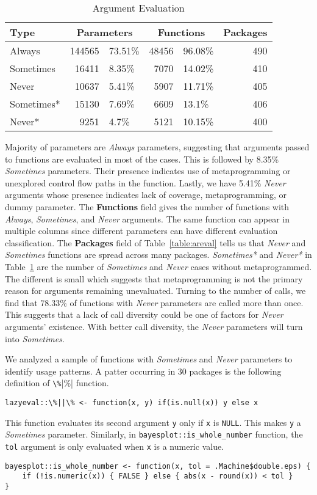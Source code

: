 \documentclass[review,nonacm,screen,acmsmall,anonymous=true]{acmart}
\newcommand{\always}{\emph{Always}\xspace}
\newcommand{\sometimes}{\emph{Sometimes}\xspace}
\newcommand{\sometimesStar}{\emph{Sometimes*}\xspace}
\newcommand{\never}{\emph{Never}\xspace}
\newcommand{\neverStar}{\emph{Never*}\xspace}
\newcommand{\code}[1]{\lstinline |#1|\xspace}
\begin{document}
\begin{table}[!h]
  \vspace{-3mm}
  \caption{Argument Evaluation}\label{table:argeval}
  \vspace{-3mm}
  \begin{tabular}{lr|lr|lr}
    \toprule
    \textbf{Type}&\multicolumn{2}{c}{\textbf{Parameters}}&\multicolumn{2}{c}{\textbf{Functions}}&\textbf{Packages}\\
    \midrule
    Always&144565&73.51\%&48456&96.08\%&490\\
    Sometimes&16411&8.35\%&7070&14.02\%&410\\
    Never&10637&5.41\%&5907&11.71\%&405\\
    \midrule
    Sometimes*&15130&7.69\%&6609&13.1\%&406\\
    Never*&9251&4.7\%&5121&10.15\%&400\\
    \bottomrule
  \end{tabular}
\end{table}

Majority of parameters are \always parameters, suggesting that arguments passed
to functions are evaluated in most of the cases. This is followed by 8.35\%
\sometimes parameters. Their presence indicates use of metaprogramming or
unexplored control flow paths in the function. Lastly, we have 5.41\% \never
arguments whose presence indicates lack of coverage, metaprogramming, or dummy
parameter. The \textbf{Functions} field gives the number of functions with
\always, \sometimes, and \never arguments. The same function can appear in
multiple columns since different parameters can have different evaluation
classification. The \textbf{Packages} field of Table~\ref{table:areval} tells us
that \never and \sometimes functions are spread across many packages.
%
\sometimesStar and \neverStar in Table~\ref{table:argeval} are the number of
\sometimes and \never cases without metaprogrammed. The different is small which
suggests that metaprogramming is not the primary reason for arguments remaining
unevaluated. Turning to the number of calls, we find that 78.33\% of functions
with \never parameters are called more than once. This suggests that a lack of
call diversity could be one of factors for \never arguments' existence. With
better call diversity, the \never parameters will turn into \sometimes.

We analyzed a sample of functions with \sometimes and \never parameters to
identify usage patterns.
%
A patter occurring in 30 packages is the following definition of \code{\%||\%}
function.
%
\begin{lstlisting}
lazyeval::\%||\% <- function(x, y) if(is.null(x)) y else x
\end{lstlisting}
%
This function evaluates its second argument \code{y} only if \code{x} is
\code{NULL}. This makes \code{y} a \sometimes parameter. Similarly, in
\code{bayesplot::is_whole_number} function, the \code{tol} argument is only
evaluated when \code{x} is a numeric value.
%
\begin{lstlisting}
bayesplot::is_whole_number <- function(x, tol = .Machine$double.eps) {
    if (!is.numeric(x)) { FALSE } else { abs(x - round(x)) < tol }
}
\end{lstlisting}
\end{document}
